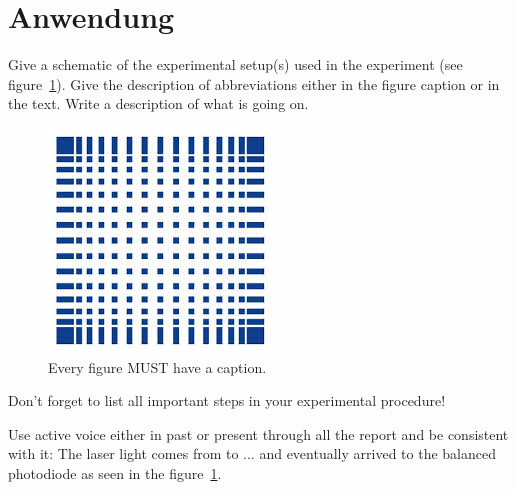 \documentclass[letterpaper,12pt]{article}
\begin{document}
		
	\section{Anwendung}
	
	Give a schematic of the experimental setup(s) used in the experiment (see
	figure~\ref{fig:samplesetup}). Give the description of  abbreviations
	either in the figure caption or in the text. Write a description of what is
	going on. 
	
	\begin{figure}[ht] 
		\centering \includegraphics[width=0.8\columnwidth]{Images/hsMannheim.jpg}
		\caption{
			\label{fig:samplesetup} %
			Every figure MUST have a caption.
		}
	\end{figure}
	
	Don't forget to list all important steps in your experimental procedure!
	
	Use active voice either in past or present through all the report and be
	consistent with it:
	The laser light comes  from to ... and eventually arrived to the
	balanced photodiode as seen in the figure~\ref{fig:samplesetup}.
	
\end{document}
